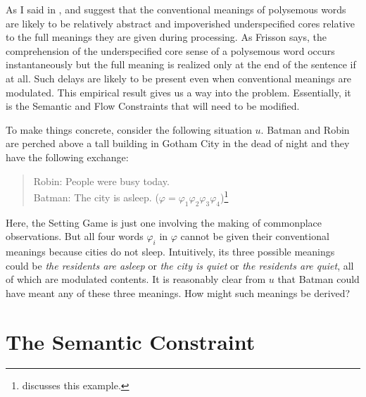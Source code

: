 As I said in , \citet{plm:rp} and \citet{frisson:sulp} suggest that the conventional meanings of polysemous words are likely to be relatively abstract and impoverished underspecified cores relative to the full meanings they are given during processing. As Frisson says, the comprehension of the underspecified core sense of a polysemous word occurs instantaneously but the full meaning is realized only at the end of the sentence if at all. Such delays are likely to be present even when conventional meanings are modulated. This empirical result gives us a way into the problem. Essentially, it is the Semantic and Flow Constraints that will need to be modified.

To make things concrete, consider the following situation $u$. Batman and Robin are perched above a tall building in Gotham City in the dead of night and they have the following exchange:

\begin{quote}
Robin: People were busy today.\\
Batman: The city is asleep. ($\varphi = \varphi_1\varphi_2\varphi_3\varphi_4$)\footnote{\citet[34-36]{recanati:lm} discusses this example.}
\end{quote}

Here, the Setting Game is just one involving the making of commonplace observations. But all four words $\varphi_i$ in $\varphi$ cannot be given their conventional meanings because cities do not sleep. Intuitively, its  three possible meanings could be \emph{the residents are asleep} or \emph{the city is quiet} or \emph{the residents are quiet}, all of which are modulated contents. It is reasonably clear from $u$ that Batman could have meant any of these three meanings. How might such meanings be derived?

\section{The Semantic Constraint}

%
%
%
%
%
%
%

